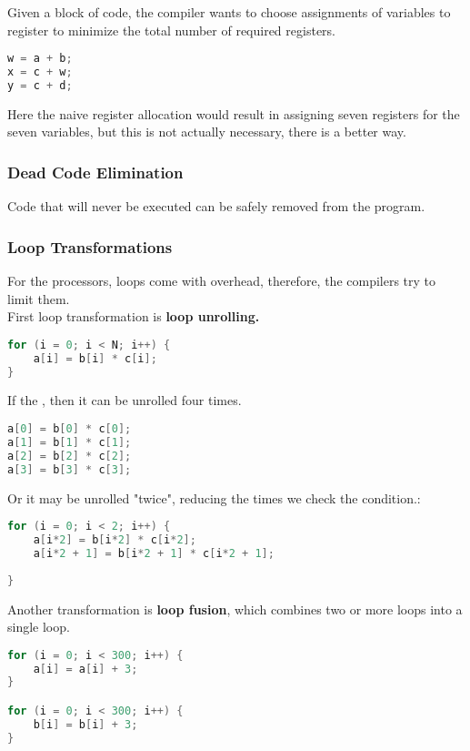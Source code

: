 \documentclass[11pt,a4paper,twocolumn]{book}
\begin{document}
Given a block of code, the compiler wants to choose assignments of variables to register to minimize the total number of required registers.

\begin{lstlisting}[language=C]
w = a + b;
x = c + w;
y = c + d;
\end{lstlisting}

Here the naive register allocation would result in assigning seven registers for the seven variables, but this is not actually necessary, there is a better way.

\subsubsection{Dead Code Elimination}

Code that will never be executed can be safely removed from the program.

\subsubsection{Loop Transformations}

For the processors, loops come with overhead, therefore, the compilers try to limit them.\\

First loop transformation is \textbf{loop unrolling.}

\begin{lstlisting}[language=C]
for (i = 0; i < N; i++) {
	a[i] = b[i] * c[i];
}
\end{lstlisting}

If the , then it can be unrolled four times.

\begin{lstlisting}[language=C]
a[0] = b[0] * c[0];
a[1] = b[1] * c[1];
a[2] = b[2] * c[2];
a[3] = b[3] * c[3];
\end{lstlisting}

Or it may be unrolled "twice", reducing the times we check the condition.:

\begin{lstlisting}[language=C]
for (i = 0; i < 2; i++) {
	a[i*2] = b[i*2] * c[i*2];
	a[i*2 + 1] = b[i*2 + 1] * c[i*2 + 1];
	
}
\end{lstlisting}

Another transformation is \textbf{loop fusion}, which combines two or more loops into a single loop.

\begin{lstlisting}[language=C]
for (i = 0; i < 300; i++) {
	a[i] = a[i] + 3;
}

for (i = 0; i < 300; i++) {
	b[i] = b[i] + 3;
}
\end{lstlisting}
\end{document}
